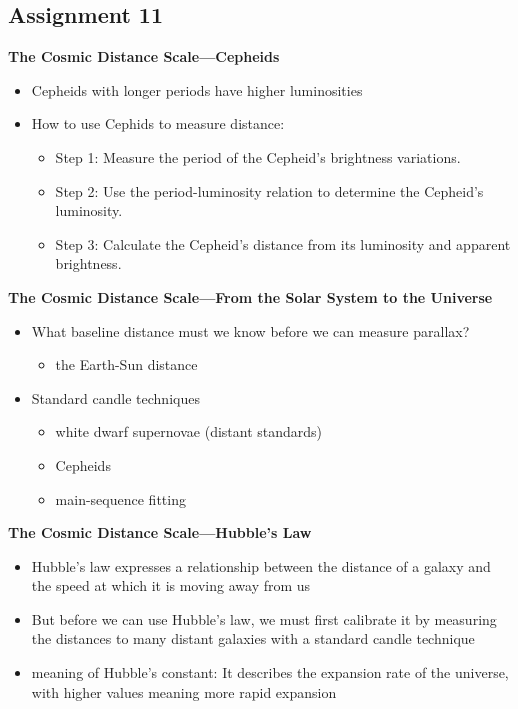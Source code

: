 \subsection{Assignment 11}

\textbf{ The Cosmic Distance Scale—Cepheids}
\begin{itemize}
    \item Cepheids with longer periods have higher luminosities
    \item How to use Cephids to measure distance:
    \begin{itemize}
        \item Step 1: Measure the period of the Cepheid's brightness variations.
        \item Step 2: Use the period-luminosity relation to determine the Cepheid's luminosity.
        \item Step 3: Calculate the Cepheid's distance from its luminosity and apparent brightness.
    \end{itemize}
\end{itemize}
\textbf{The Cosmic Distance Scale—From the Solar System to the Universe}
\begin{itemize}
    \item What baseline distance must we know before we can measure parallax?
    \begin{itemize}
        \item the Earth-Sun distance
    \end{itemize}
    \item Standard candle techniques
    \begin{itemize}
        \item white dwarf supernovae (distant standards)
        \item Cepheids
        \item main-sequence fitting
    \end{itemize}
\end{itemize}
\textbf{The Cosmic Distance Scale—Hubble's Law}
\begin{itemize}
    \item Hubble's law expresses a relationship between the distance of a galaxy and the speed at which it is moving away from us
    \item But before we can use Hubble's law, we must first calibrate it by measuring the distances to many distant galaxies with a standard candle technique
    \item meaning of Hubble's constant: It describes the expansion rate of the universe, with higher values meaning more rapid expansion
\end{itemize}
